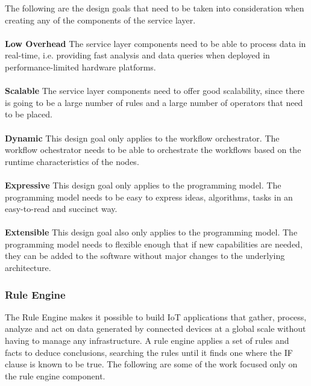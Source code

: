 The following are the design goals that need to be taken into consideration when creating any of the components of the service layer.
\\\\
\textbf{Low Overhead} The service layer components need to be able to process data in real-time, i.e. providing fast analysis and data queries when deployed in performance-limited hardware platforms.
\\\\
\textbf{Scalable} The service layer components need to offer good scalability, since there is going to be a large number of rules and a large number of operators that need to be placed.
\\\\
\textbf{Dynamic} This design goal only applies to the workflow orchestrator. The workflow ochestrator needs to be able to orchestrate the workflows based on the runtime characteristics of the nodes. 
\\\\
\textbf{Expressive} This design goal only applies to the programming model. The programming model needs to be easy to express ideas, algorithms, tasks in an easy-to-read and succinct way.
\\\\
\textbf{Extensible} This design goal also only applies to the programming model. The programming model needs to flexible enough that if new capabilities are needed, they can be added to the software without major changes to the underlying architecture.


\subsubsection{Rule Engine}

The Rule Engine makes it possible to build IoT applications that gather, process, analyze and act on data generated by connected devices at a global scale without having to manage any infrastructure. A rule engine applies a set of rules and facts to deduce conclusions, searching the rules until it finds one where the IF clause is known to be true. The following are some of the work focused only on the rule engine component.

